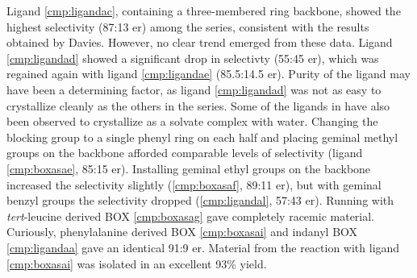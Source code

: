 Ligand \ref{cmp:ligandac}, containing a three-membered ring backbone, showed the highest selectivity
(87:13 er) among the series, consistent with the results obtained by Davies. However, no clear trend
emerged from these data. Ligand \ref{cmp:ligandad} showed a significant drop in selectivty (55:45
er), which was regained again with ligand \ref{cmp:ligandae} (85.5:14.5 er). Purity of the ligand
may have been a determining factor, as ligand \ref{cmp:ligandad} was not as easy to crystallize
cleanly as the others in the series. Some of the ligands in  have also
been observed to crystallize as a solvate complex with water. Changing the blocking group to a single phenyl ring on each half and placing geminal methyl groups
on the backbone afforded comparable levels of selectivity (ligand \ref{cmp:boxasae}, 85:15 er).
Installing geminal ethyl groups on the backbone increased the selectivity slightly
(\ref{cmp:boxasaf}, 89:11 er), but with geminal benzyl groups the selectivity dropped
(\ref{cmp:ligandal}, 57:43 er). Running with \textit{tert}-leucine derived BOX \ref{cmp:boxasag}
gave completely racemic material. Curiously, phenylalanine derived BOX \ref{cmp:boxasai} and
indanyl BOX \ref{cmp:ligandaa} gave an identical 91:9 er. Material from the reaction with ligand
\ref{cmp:boxasai} was isolated in an excellent 93\% yield.

